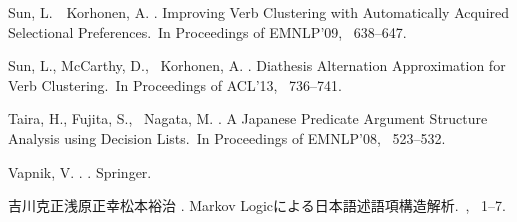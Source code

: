 \documentclass[japanese]{jnlp_1.4}
\begin{document}
\begin{thebibliography}{}
Sun, L.\BBACOMMA\ \BBA\ Korhonen, A. \BBCP.
\newblock \BBOQ Improving Verb Clustering with Automatically Acquired
  Selectional Preferences.\BBCQ\
\newblock In {\Bem Proceedings of EMNLP'09}, \mbox{\BPGS\ 638--647}.

Sun, L., McCarthy, D., \BBA\ Korhonen, A. \BBCP.
\newblock \BBOQ Diathesis Alternation Approximation for Verb Clustering.\BBCQ\
\newblock In {\Bem Proceedings of ACL'13}, \mbox{\BPGS\ 736--741}.

Taira, H., Fujita, S., \BBA\ Nagata, M. \BBOP 2008\BBCP.
\newblock \BBOQ A {J}apanese Predicate Argument Structure Analysis using
  Decision Lists.\BBCQ\
\newblock In {\Bem Proceedings of EMNLP'08}, \mbox{\BPGS\ 523--532}.

Vapnik, V. \BBOP 1995\BBCP.
.
\newblock Springer.

吉川克正\JBA 浅原正幸\JBA 松本裕治 \BBCP.
\newblock Markov Logicによる日本語述語項構造解析.\
\newblock {}, \mbox{\BPGS\
  1--7}.

\end{thebibliography}
\end{document}

